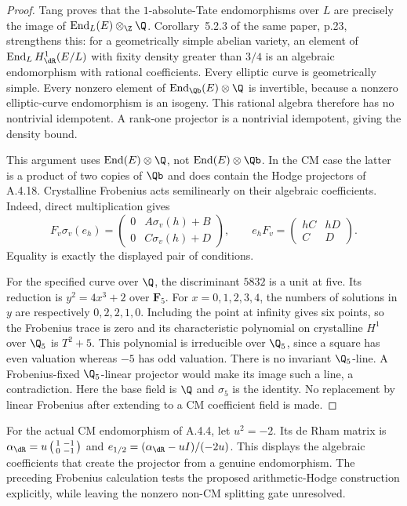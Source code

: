 \begin{proof}
Tang \cite[Definition 2.3.1 and Theorem 2.3.3, p.7]{EllTang2017} proves that the $1$-absolute-Tate endomorphisms over $L$ are precisely the image of
$\operatorname{End}_L(E)\otimes_{\Z}\Q$. Corollary~5.2.3 of the same paper, p.23, strengthens this: for a geometrically simple abelian variety, an element of $\operatorname{End}_L H^1_{\dR}(E/L)$ with fixity density greater than $3/4$ is an algebraic endomorphism with rational coefficients. Every elliptic curve is geometrically simple. Every nonzero element of $\operatorname{End}_{\Qb}(E)\otimes\Q$ is invertible, because a nonzero elliptic-curve endomorphism is an isogeny. This rational algebra therefore has no nontrivial idempotent. A rank-one projector is a nontrivial idempotent, giving the density bound.

This argument uses $\operatorname{End}(E)\otimes\Q$, not $\operatorname{End}(E)\otimes\Qb$. In the CM case the latter is a product of two copies of $\Qb$ and does contain the Hodge projectors of A.4.18. Crystalline Frobenius acts semilinearly on their algebraic coefficients. Indeed, direct multiplication gives
\[
 F_v\sigma_v(e_h)=
 \begin{pmatrix}0&A\sigma_v(h)+B\\0&C\sigma_v(h)+D\end{pmatrix},
 \qquad
 e_hF_v=\begin{pmatrix}hC&hD\\C&D\end{pmatrix}.
\]
Equality is exactly the displayed pair of conditions.

For the specified curve over $\Q$, the discriminant $5832$ is a unit at five. Its reduction is $y^2=4x^3+2$ over $\mathbf F_5$. For $x=0,1,2,3,4$, the numbers of solutions in $y$ are respectively $0,2,2,1,0$. Including the point at infinity gives six points, so the Frobenius trace is zero and its characteristic polynomial on crystalline $H^1$ over $\Q_5$ is $T^2+5$. This polynomial is irreducible over $\Q_5$, since a square has even valuation whereas $-5$ has odd valuation. There is no invariant $\Q_5$-line. A Frobenius-fixed $\Q_5$-linear projector would make its image such a line, a contradiction. Here the base field is $\Q$ and $\sigma_5$ is the identity. No replacement by linear Frobenius after extending to a CM coefficient field is made.
\end{proof}

For the actual CM endomorphism of A.4.4, let $u^2=-2$. Its de Rham matrix is
$\alpha_{\dR}=u\left(\begin{smallmatrix}1&-1\\0&-1\end{smallmatrix}\right)$ and
$e_{1/2}=(\alpha_{\dR}-uI)/(-2u)$. This displays the algebraic coefficients that create the projector from a genuine endomorphism. The preceding Frobenius calculation tests the proposed arithmetic-Hodge construction explicitly, while leaving the nonzero non-CM splitting gate unresolved.

